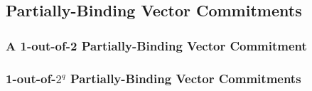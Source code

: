 \subsection{Partially-Binding Vector Commitments}

\subsubsection{A 1-out-of-2 Partially-Binding Vector Commitment}

\subsubsection{1-out-of-$2^q$ Partially-Binding Vector Commitments}









